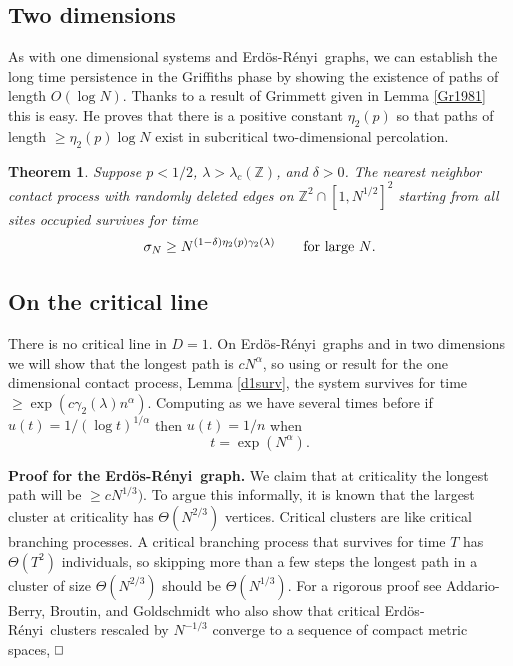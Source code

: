 \documentclass[11pt]{article}
\newtheorem{theorem}{Theorem}
\theoremstyle{definition}
\def\beq{ \begin{equation} }
\def\eeq{ \end{equation} }
\def\mn{\medskip\noindent}
\def\square{\vcenter{\vbox{\hrule height .4pt
  \hbox{\vrule width .4pt height 5pt \kern 5pt
        \vrule width .4pt} \hrule height .4pt}}}
\def\eopt{\hfill$\square$}
\def\ZZ{\mathbb{Z}}
\def\ER{Erd\"os-R\'enyi\ }
\begin{document}
\subsection{Two dimensions}



As with one dimensional systems and \ER graphs, we can establish the long time persistence in the Griffiths phase by showing the existence of paths of length $O(\log N)$. Thanks to a result of Grimmett \cite{Gri81} given in Lemma \ref{Gr1981} this is easy. He proves that there is a positive constant $\eta_2(p)$ so that paths of length $\ge \eta_2(p) \log N$ exist in subcritical two-dimensional percolation.



\begin{theorem} \label{Gphase2D}
Suppose $p<1/2$, $\lambda > \lambda_c(\ZZ)$, and $\delta>0$.  The nearest neighbor contact process with randomly deleted edges on $\ZZ^2 \cap [1,N^{1/2}]^2$  starting from all sites occupied survives for time
\beq
\sigma_N \ge N^{(1-\delta) \eta_2(p) \gamma_2(\lambda)}
\qquad\hbox{for large $N$.}
\label{d2Gphase}
\eeq
\end{theorem}


\subsection{On the critical line}

There is no critical line in $D=1$. On \ER graphs and in two dimensions we will show that the longest path is $c N^\alpha$, so using or result for the one dimensional contact process, Lemma \ref{d1surv}, the system survives for time
$\ge \exp(c \gamma_2(\lambda) n^\alpha)$. 
Computing as we have several times before if $u(t) = 1/(\log t)^{1/\alpha}$ then $u(t) = 1/n$ when 
$$
t = \exp( N^{\alpha}).
$$

\mn
{\bf Proof for the \ER graph.} We claim that at criticality the longest path will be $\ge cN^{1/3})$. To argue this informally, it is known that the largest cluster at criticality has $\Theta(N^{2/3})$ vertices. Critical clusters are like critical branching processes.  A critical branching process that survives for time $T$ has $\Theta(T^2)$ individuals, so skipping more than a few steps the longest path in a cluster of size $\Theta(N^{2/3})$ should be $\Theta(N^{1/3})$. For a rigorous proof see Addario-Berry, Broutin, and Goldschmidt \cite{Louigi1,Louigi2} who also show  that critical \ER clusters rescaled by $N^{-1/3}$ converge to a sequence of compact metric spaces,  \eopt 
\end{document}
